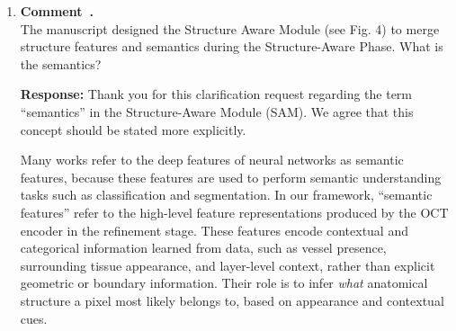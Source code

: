 \documentclass[11pt]{article}
\newcommand{\commentresponse}[2]{{\color{blue}\textbf{Response:} #2}}
\newcommand{\commentitem}{\item \textbf{Comment~\arabic{enumi}.}\\\ignorespaces}
\begin{document}
\begin{enumerate}
{    The newly clarified efficiency text is highlighted in the revised manuscript and is quoted below in italics for convenience:\\
    \textit{{\color{blue}``\textbf{A. Scaling Trends of Computational Complexity and Performance}\\ \textbf{1) Architecture and FLOPs Scaling}\\ In addition to segmentation accuracy, we compare model complexity in terms of parameter count and GFLOPs on the OCT-CCV dataset. As shown in Fig.~\ref{fig:complexity_compare_3}, the proposed SMC-Net series consistently achieves a favorable accuracy--efficiency trade-off. In particular, SMC-Net-S attains the best choroidal layer and vessel DSC while maintaining moderate model size and computational cost.\\ \textbf{2) Inference Time}\\ We further evaluate inference efficiency on a single NVIDIA RTX 4090 D GPU (batch size 1, $512\times512$, fp32). SMC-Net-S processes one OCT image in 12.6~ms (approximately 79 FPS), demonstrating its suitability for real-time or near-real-time deployment. Table III reports the inference-time breakdown of the SMC-Net series, showing consistent scaling behavior across Tiny, Small, and Base variants.Compared with the Transformer-based TACLNet~\cite{wen2024}, SMC-Net-S achieves comparable or better performance with approximately half the parameters and nearly one order of magnitude fewer GFLOPs. Moreover, performance gains saturate beyond SMC-Net-S (49.04M parameters), indicating diminishing returns from further model scaling.''}}\\
    }

    \commentitem The manuscript designed the Structure Aware Module (see Fig. 4) to merge structure features and semantics during the Structure-Aware Phase. What is the semantics?
	    
    \commentresponse{6}{
    Thank you for this clarification request regarding the term ``semantics'' in the Structure-Aware Module (SAM). We agree that this concept should be stated more explicitly.

    Many works refer to the deep features of neural networks as semantic features, because these features are used to perform semantic understanding tasks such as classification and segmentation. In our framework, ``semantic features'' refer to the high-level feature representations produced by the OCT encoder in the refinement stage. These features encode contextual and categorical information learned from data, such as vessel presence, surrounding tissue appearance, and layer-level context, rather than explicit geometric or boundary information. Their role is to infer \emph{what} anatomical structure a pixel most likely belongs to, based on appearance and contextual cues.

}
\end{enumerate}
\end{document}
